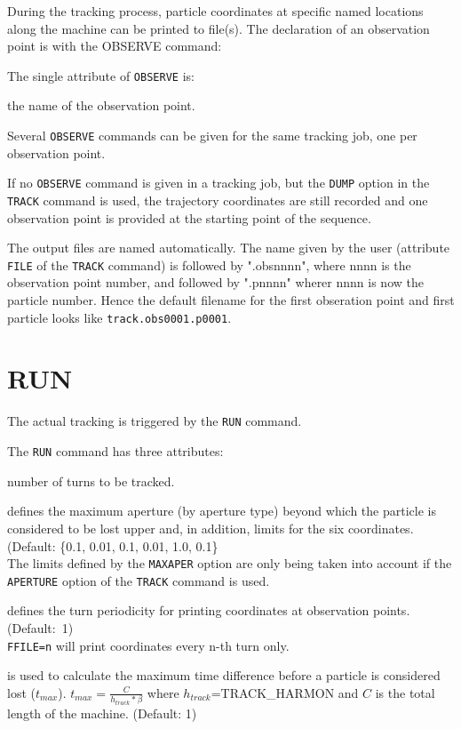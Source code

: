 During the tracking process, particle coordinates at specific named
locations along the machine can be printed to file(s). The declaration of
an observation point is with the OBSERVE command: 


The single attribute of \texttt{OBSERVE} is:
\begin{madlist}
   the name of the observation point. 
\end{madlist}
  
Several \texttt{OBSERVE} commands can be given for the same tracking
job, one per observation point. 

If no \texttt{OBSERVE} command is given in a tracking job, but the
\texttt{DUMP} option in the \texttt{TRACK} command is used, the
trajectory coordinates are still recorded and one observation point is
provided at the starting point of the sequence. 
     
The output files are named automatically. The name given by
the user (attribute \texttt{FILE} of the \texttt{TRACK} command) is
followed by ".obsnnnn", where nnnn is the observation point number, and followed by 
".pnnnn"  wherer nnnn is now the particle number. Hence the default
filename for the first obseration point and first particle looks like
\texttt{track.obs0001.p0001}.


\section{RUN}
\label{sec:run}

The actual tracking is triggered by the \texttt{RUN} command.


The \texttt{RUN} command has three attributes:

\begin{madlist}
   number of turns to be tracked.

   defines the maximum aperture (by
  aperture type) beyond which the particle is considered
  to be lost upper and, in addition, limits for the six coordinates.\\
  (Default: \{0.1, 0.01, 0.1, 0.01, 1.0, 0.1\} \\
  The limits defined by the \texttt{MAXAPER} option are only being taken
  into account if the \texttt{APERTURE} option of the \texttt{TRACK}
  command is used. 

   defines the turn periodicity for printing coordinates at
   observation points. (Default:~1)\\

   \texttt{FFILE=n} will print coordinates every n-th turn only. 

    is used to calculate the maximum time difference before a particle is considered lost ($t_{max}$). 
    $t_{max} =\frac{C}{h_{track}*\beta}$ where $h_{track}$=TRACK\_HARMON and $C$ is the total length of the machine.  (Default: 1)
\end{madlist}


